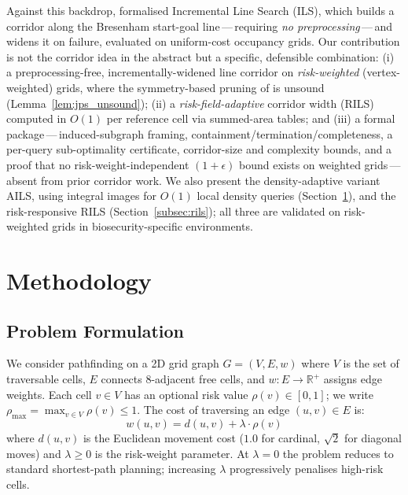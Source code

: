 \documentclass[preprint,12pt,authoryear]{elsarticle}
\begin{document}
Against this backdrop, \citet{Elshahed2025ILS} formalised Incremental Line Search (ILS), which builds a corridor along the Bresenham start-goal line\,---\,requiring \emph{no preprocessing}\,---\,and widens it on failure, evaluated on uniform-cost occupancy grids. Our contribution is not the corridor idea in the abstract but a specific, defensible combination: (i) a preprocessing-free, incrementally-widened line corridor on \emph{risk-weighted} (vertex-weighted) grids, where the symmetry-based pruning of \citet{Rabin2016,Harabor2011} is unsound (Lemma~\ref{lem:jps_unsound}); (ii) a \emph{risk-field-adaptive} corridor width (RILS) computed in $O(1)$ per reference cell via summed-area tables; and (iii) a formal package\,---\,induced-subgraph framing, containment/termination/completeness, a per-query sub-optimality certificate, corridor-size and complexity bounds, and a proof that no risk-weight-independent $(1+\epsilon)$ bound exists on weighted grids\,---\,absent from prior corridor work. We also present the density-adaptive variant AILS, using integral images for $O(1)$ local density queries (Section~\ref{sec:method}), and the risk-responsive RILS (Section~\ref{subsec:rils}); all three are validated on risk-weighted grids in biosecurity-specific environments.

\section{Methodology}\label{sec:method}

\subsection{Problem Formulation}

We consider pathfinding on a 2D grid graph $G = (V, E, w)$ where $V$ is the set of traversable cells, $E$ connects 8-adjacent free cells, and $w: E \to \mathbb{R}^+$ assigns edge weights.
Each cell $v \in V$ has an optional risk value $\rho(v) \in [0, 1]$; we write $\rho_{\max} = \max_{v \in V} \rho(v) \leq 1$.
The cost of traversing an edge $(u, v) \in E$ is:
\begin{equation}\label{eq:cost}
    w(u, v) = d(u, v) + \lambda \cdot \rho(v)
\end{equation}
where $d(u, v)$ is the Euclidean movement cost ($1.0$ for cardinal, $\sqrt{2}$ for diagonal moves) and $\lambda \geq 0$ is the risk-weight parameter.
At $\lambda = 0$ the problem reduces to standard shortest-path planning; increasing $\lambda$ progressively penalises high-risk cells.
\end{document}
